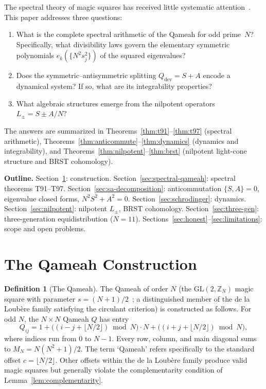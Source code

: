 \documentclass[aip,jmp,reprint,superscriptaddress,floatfix,nofootinbib]{revtex4-2}
\theoremstyle{definition}
\newtheorem{definition}[theorem]{Definition}
\theoremstyle{remark}
\begin{document}
The spectral theory of magic squares has received little systematic
attention~\cite{andrews,kraitchik,mattingly}.  This paper addresses three questions:

\begin{enumerate}
\item What is the complete spectral arithmetic of the Qameah
      for odd prime~$N$?  Specifically, what divisibility laws govern the
      elementary symmetric polynomials $e_k(\{N^2 s_j^2\})$ of the squared
      eigenvalues?

\item Does the symmetric--antisymmetric splitting $Q_{\mathrm{dev}} = S + A$
      encode a dynamical system?  If so, what are its integrability
      properties?

\item What algebraic structures emerge from the nilpotent operators
      $L_\pm = S \pm A/N$?
\end{enumerate}

The answers are summarized in Theorems~\ref{thm:t91}--\ref{thm:t97}
(spectral arithmetic), Theorems~\ref{thm:anticommute}--\ref{thm:dynamics}
(dynamics and integrability), and
Theorems~\ref{thm:nilpotent}--\ref{thm:brst} (nilpotent light-cone
structure and BRST cohomology).

\medskip\noindent\textbf{Outline.}
Section~\ref{sec:siamese}: construction.
Section~\ref{sec:spectral-qameah}: spectral theorems T91--T97.
Section~\ref{sec:sa-decomposition}: anticommutation $\{S,A\}=0$,
eigenvalue closed forms, $N^2S^2+A^2=0$.
Section~\ref{sec:schrodinger}: dynamics.
Section~\ref{sec:nilpotent}: nilpotent $L_\pm$, BRST cohomology.
Section~\ref{sec:three-gen}: three-generation equidistribution ($N{=}11$).
Sections~\ref{sec:honest}--\ref{sec:limitations}: scope and open problems.

\section{The Qameah Construction}
\label{sec:siamese}

\begin{definition}[The Qameah]
\label{def:siamese}
The Qameah of order $N$ (the $\mathrm{GL}(2,\mathbb{Z}_N)$ magic square
with parameter $s = (N{+}1)/2$~\cite{nordgren}; a distinguished member of the
de la Loub\`ere family satisfying the circulant criterion) is
constructed as follows.
For odd $N$, the $N\times N$ Qameah $Q$ has entry
\[
Q_{ij} = 1 + \bigl((i-j+\lfloor N/2\rfloor)\bmod N\bigr)\cdot N
        + \bigl((i+j+\lfloor N/2\rfloor)\bmod N\bigr),
\]
where indices run from $0$ to $N-1$.  Every row, column, and main
diagonal sums to $M_N = N(N^2+1)/2$.
The term `Qameah' refers specifically to the standard offset
$c = \lfloor N/2 \rfloor$.  Other offsets within the de la Loub\`ere
family produce valid magic squares but generally violate the
complementarity condition of Lemma~\ref{lem:complementarity}.
\end{definition}
\end{document}
